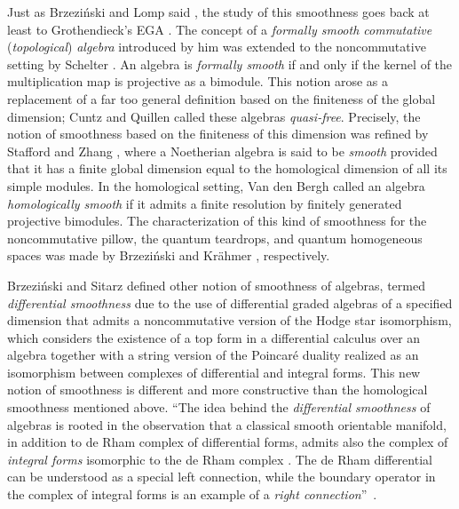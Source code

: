 \documentclass{amsart}
\theoremstyle{definition}
\theoremstyle{remark}
\numberwithin{equation}{section}
\begin{document}
Just as Brzezi\'nski and Lomp said \cite[Section 1]{BrzezinskiLomp2018}, the study of this smoothness goes back at least to Grothendieck's EGA \cite{Grothendieck1964}. The concept of a {\em formally smooth commutative} ({\em topological}) {\em algebra} introduced by him was extended to the noncommutative setting by Schelter \cite{Schelter1986}. An algebra is {\em formally smooth} if and only if the kernel of the multiplication map is projective as a bimodule. This notion arose as a replacement of a far too general definition based on the finiteness of the global dimension; Cuntz and Quillen \cite{CuntzQuillen1995} called these algebras {\em quasi-free}. Precisely, the notion of smoothness based on the finiteness of this dimension was refined by Stafford and Zhang \cite{StaffordZhang1994}, where a Noetherian algebra is said to be {\em smooth} provided that it has a finite global dimension equal to the homological dimension of all its simple modules. In the homological setting, Van den Bergh \cite{VandenBergh1998} called an algebra {\em homologically smooth} if it admits a finite resolution by finitely generated projective bimodules. The characterization of this kind of smoothness for the noncommutative pillow, the quantum teardrops, and quantum homogeneous spaces was made by Brzezi{\'n}ski \cite{Brzezinski2008, Brzezinski2014} and Kr\"ahmer \cite{Krahmer2012}, respectively.

Brzezi{\'n}ski and Sitarz \cite{BrzezinskiSitarz2017} defined other notion of smoothness of algebras, termed {\em differential smoothness} due to the use of differential graded algebras of a specified dimension that admits a noncommutative version of the Hodge star isomorphism, which considers the existence of a top form in a differential calculus over an algebra together with a string version of the Poincar\'e duality realized as an isomorphism between complexes of differential and integral forms. This new notion of smoothness is different and more constructive than the homological smoothness mentioned above. \textquotedblleft The idea behind the {\em differential smoothness} of algebras is rooted in the observation that a classical smooth orientable manifold, in addition to de Rham complex of differential forms, admits also the complex of {\em integral forms} isomorphic to the de Rham complex \cite[Section 4.5]{Manin1997}. The de Rham differential can be understood as a special left connection, while the boundary operator in the complex of integral forms is an example of a {\em right connection}\textquotedblright\ \cite[p. 413]{BrzezinskiSitarz2017}.
\end{document}
